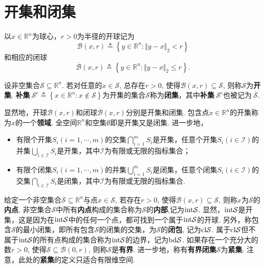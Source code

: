  \section{开集和闭集}
以$x \in \mathbb{R}^{n}$为球心，$r > 0$为半径的开球记为 
 \begin{equation*}
     \mathcal{B}\left(x,r\right) \triangleq \left\{ y \in \mathbb{R}^{n} : \Vert y - x \Vert_{2} < r \right\}
 \end{equation*}
 和相应的闭球
  \begin{equation*}
     \overline{\mathcal{B}}\left(x,r\right) \triangleq \left\{ y \in \mathbb{R}^{n} : \Vert y - x \Vert_{2} \leq r \right\}.
 \end{equation*}
\begin{definition}\label{Chapter0Open}
    设非空集合$\mathcal{S} \subseteq \mathbb{R}^{n}$. 若对任意的$x \in \mathcal{S}$, 总存在$r > 0$, 使得$\mathcal{B}\left(x,r\right) \subseteq \mathcal{S}$, 则称$\mathcal{S}$为\textbf{开集}. \textbf{补集}$~\mathcal{S}^{\mathrm{c}} \triangleq \left\{ x \in \mathbb{R}^{n} : x \notin \mathcal{S} \right\}$为开集的集合$\mathcal{S}$称为\textbf{闭集}，其中\textbf{补集}$~\mathcal{S}^{\mathrm{c}}$也被记为$~\overline{\mathcal{S}}$.
\end{definition}
 显然地，开球$\mathcal{B}\left(x,r\right)$和闭球$\overline{\mathcal{B}}\left(x,r\right)$分别是开集和闭集. 包含点$x \in \mathbb{R}^{n}$的开集称为$x$的一个\textbf{领域}. 全空间$\mathbb{R}^{n}$和空集$\emptyset$即是开集又是闭集. 进一步地，
 \begin{itemize}
  \setlength{\itemsep}{0pt}
\setlength{\parsep}{0pt}
\setlength{\parskip}{0pt}
     \item[$(1)$] 有限个开集$S_i(i=1,\cdots,m)$的交集$\bigcap_{i=1}^{m}S_i$是开集，任意个开集$S_i(i \in \mathcal{I} )$的并集$\bigcup_{i \in \mathcal{I}}S_i$是开集，其中$\mathcal{I}$为有限或无限的指标集合；
     \item[$(2)$] 有限个闭集$S_i(i=1,\cdots,m)$的并集$\bigcup_{i=1}^{m}S_i$是闭集，任意个闭集$S_i(i \in \mathcal{I} )$的交集$\bigcap_{i \in \mathcal{I}}S_i$是闭集，其中$\mathcal{I}$为有限或无限的指标集合.
 \end{itemize}

给定一个非空集合$\mathcal{S} \subseteq \mathbb{R}^{n}$与点$x \in \mathcal{S}$, 若存在$r > 0$, 使得$\mathcal{B}\left(x,r\right) \subseteq \mathcal{S}$, 则称$x$为$\mathcal{S}$的\textbf{内点}. 非空集合$\mathcal{S}$中所有\textbf{内点}构成的集合称为$\mathcal{S}$的\textbf{内部},记为$\rm{int} \mathcal{S}$. 显然，$\rm{int} \mathcal{S}$是开集，这是因为在$\rm{int} \mathcal{S}$中的任何一个点，都可找到一个属于$\rm{int} \mathcal{S}$的开球. 另外，称包含$\mathcal{S}$的最小闭集，即所有包含$\mathcal{S}$的闭集的交集，为$\mathcal{S}$的\textbf{闭包}, 记为$\rm{cl} \mathcal{S}$. 属于$\rm{cl} \mathcal{S}$但不属于$\rm{int} \mathcal{S}$的所有点构成的集合称为$\rm{int} \mathcal{S}$的边界，记为$\rm{bd} \mathcal{S}$. 如果存在一个充分大的数$r > 0$, 使得$\mathcal{S} \subseteq \mathcal{B}\left(0,r\right)$, 则称$\mathcal{S}$是\textbf{有界}. 进一步地，称有\textbf{有界闭集}$\mathcal{S}$为\textbf{紧集}. 注意，此处的\textbf{紧集}的定义只适合有限维空间.



